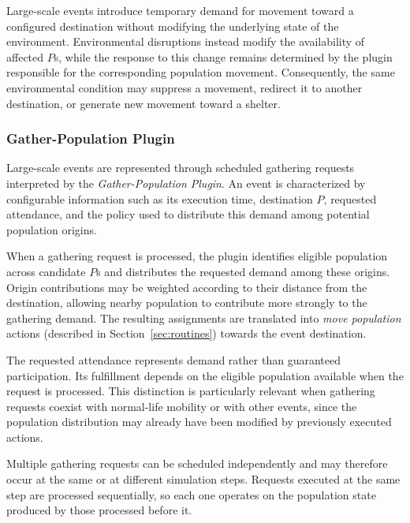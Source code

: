 Large-scale events introduce temporary demand for movement toward a configured destination without modifying the underlying state of the environment. Environmental disruptions instead modify the availability of affected $P$s, while the response to this change remains determined by the plugin responsible for the corresponding population movement. 
Consequently, the same environmental condition may suppress a movement, redirect it to another destination, or generate new movement toward a shelter. %

\subsubsection{Gather-Population Plugin} \label{sec:gather_population_plugin_inputs}

Large-scale events are represented through scheduled gathering requests interpreted by the \textit{Gather-Population Plugin}. An event is characterized by configurable information such as its execution time, destination $P$, requested attendance, and the policy used to distribute this demand among potential population origins.

When a gathering request is processed, the plugin identifies eligible population across candidate $P$s and distributes the requested demand among these origins. Origin contributions may be weighted according to their distance from the destination, allowing nearby population to contribute more strongly to the gathering demand. The resulting assignments are translated into \textit{move population} actions (described in Section~\ref{sec:routines}) towards the event destination.

The requested attendance represents demand rather than guaranteed participation. Its fulfillment depends on the eligible population available when the request is processed. This distinction is particularly relevant when gathering requests coexist with normal-life mobility or with other events, since the population distribution may already have been modified by previously executed actions.

Multiple gathering requests can be scheduled independently and may therefore occur at the same or at different simulation steps. Requests executed at the same step are processed sequentially, so each one operates on the population state produced by those processed before it. %



